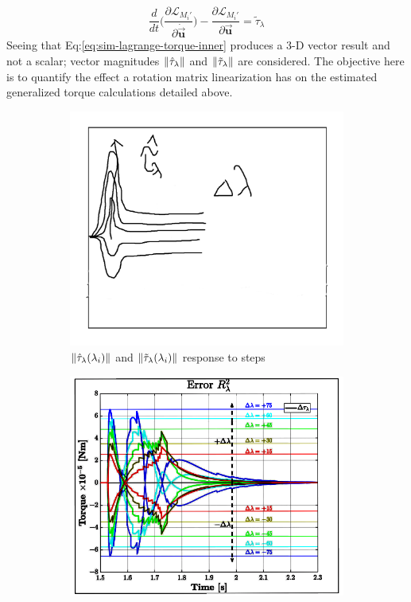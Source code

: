 \begin{equation}\label{eq:sim-lagrange-torque-inner}
\frac{d}{dt}\bigg(\frac{\partial\mathcal{L}_{M_i'}}{\partial\dot{\vec{\mathbf{u}}}}\bigg)-\frac{\partial\mathcal{L}_{M_i'}}{\partial\vec{\mathbf{u}}}=\widetilde{\tau}_\lambda
\end{equation}
Seeing that Eq:\ref{eq:sim-lagrange-torque-inner} produces a 3-D vector result and not a scalar; vector magnitudes $\left\lVert\hat{\tau}_\lambda\right\rVert$ and $\left\lVert\tilde{\tau}_\lambda\right\rVert$ are considered. The objective here is to quantify the effect a rotation matrix linearization has on the estimated generalized torque calculations detailed above.
\par
\begin{figure}[hbtp]
\centering
\begin{subfigure}{0.49\textwidth}
\centering
\includegraphics[width=\textwidth]{graphs/tau-lambda-hat}
\caption{$\left\lVert\hat{\tau}_\lambda(\lambda_i)\right\rVert$ and $\left\lVert\tilde{\tau}_\lambda(\lambda_i)\right\rVert$ response to steps}
\label{fig:tau-lambda-hat}
\end{subfigure}
\begin{subfigure}{0.49\textwidth}
\includegraphics[width=\textwidth]{graphs/tau-lambda-hat-r}

\end{subfigure}
\end{figure}
